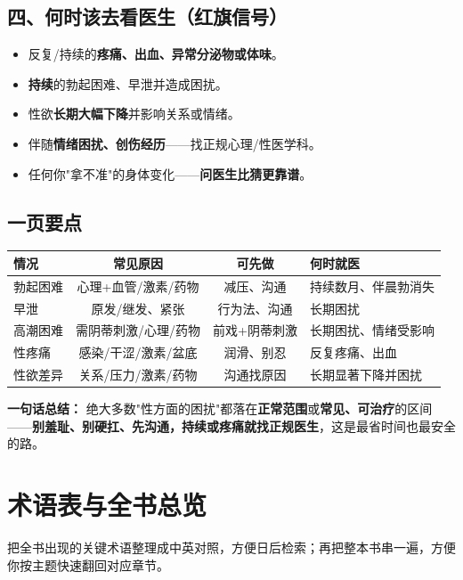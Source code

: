 \documentclass[12pt,UTF8,openany]{ctexbook}
\begin{document}
\section{四、何时该去看医生（红旗信号）}

\begin{itemize}[leftmargin=2em,itemsep=0.3em]
  \item 反复/持续的\textbf{疼痛、出血、异常分泌物或体味}。
  \item \textbf{持续}的勃起困难、早泄并造成困扰。
  \item 性欲\textbf{长期大幅下降}并影响关系或情绪。
  \item 伴随\textbf{情绪困扰、创伤经历}——找正规心理/性医学科。
  \item 任何你"拿不准"的身体变化——\textbf{问医生比猜更靠谱}。
\end{itemize}

\section{一页要点}

\begin{tabularx}{\textwidth}{lCCX}
\toprule
情况 & 常见原因 & 可先做 & 何时就医 \\
\midrule
勃起困难 & 心理+血管/激素/药物 & 减压、沟通 & 持续数月、伴晨勃消失 \\
早泄 & 原发/继发、紧张 & 行为法、沟通 & 长期困扰 \\
高潮困难 & 需阴蒂刺激/心理/药物 & 前戏+阴蒂刺激 & 长期困扰、情绪受影响 \\
性疼痛 & 感染/干涩/激素/盆底 & 润滑、别忍 & 反复疼痛、出血 \\
性欲差异 & 关系/压力/激素/药物 & 沟通找原因 & 长期显著下降并困扰 \\
\bottomrule
\end{tabularx}

\vspace{1em}
\noindent\textbf{一句话总结：} 绝大多数"性方面的困扰"都落在\textbf{正常范围}或\textbf{常见、可治疗}的区间——\textbf{别羞耻、别硬扛、先沟通，持续或疼痛就找正规医生}，这是最省时间也最安全的路。

\chapter{术语表与全书总览}
\label{chap:glossary}

把全书出现的关键术语整理成中英对照，方便日后检索；再把整本书串一遍，方便你按主题快速翻回对应章节。
\end{document}
